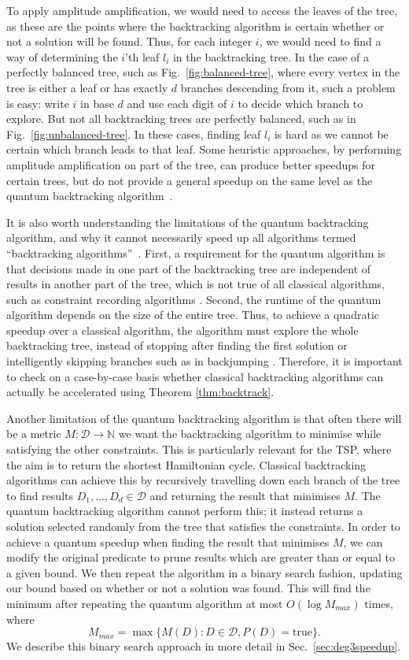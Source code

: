To apply amplitude amplification, we would need to access the leaves of the tree, as these are the points where the backtracking algorithm is certain whether or not a solution will be found. Thus, for each integer $i$, we would need to find a way of determining the $i$'th leaf $l_i$ in the backtracking tree. In the case of a perfectly balanced tree, such as Fig.\ \ref{fig:balanced-tree}, where every vertex in the tree is either a leaf or has exactly $d$ branches descending from it, such a problem is easy: write $i$ in base $d$ and use each digit of $i$ to decide which branch to explore. But not all backtracking trees are perfectly balanced, such as in Fig.\ \ref{fig:unbalanced-tree}. In these cases, finding leaf $l_i$ is hard as we cannot be certain which branch leads to that leaf. Some heuristic approaches, by performing amplitude amplification on part of the tree, can produce better speedups for certain trees, but do not provide a general speedup on the same level as the quantum backtracking algorithm~\cite{montanaro2015}.

It is also worth understanding the limitations of the quantum backtracking algorithm, and why it cannot necessarily speed up all algorithms termed ``backtracking algorithms''~\cite{montanaro2015}. First, a requirement for the quantum algorithm is that decisions made in one part of the backtracking tree are independent of results in another part of the tree, which is not true of all classical algorithms, such as constraint recording algorithms \cite{dechter1990}. Second, the runtime of the quantum algorithm depends on the size of the entire tree. Thus, to achieve a quadratic speedup over a classical algorithm, the algorithm must explore the whole backtracking tree, instead of stopping after finding the first solution or intelligently skipping branches such as in backjumping \cite{dechter1990}. Therefore, it is important to check on a case-by-case basis whether classical backtracking algorithms can actually be accelerated using Theorem \ref{thm:backtrack}.

Another limitation of the quantum backtracking algorithm is that often there will be a metric $M:\mathcal{D} \rightarrow \mathbb{N}$ we want the backtracking algorithm to minimise while satisfying the other constraints. This is particularly relevant for the TSP, where the aim is to return the shortest Hamiltonian cycle. Classical backtracking algorithms can achieve this by recursively travelling down each branch of the tree to find results $D_1,\dots,D_d \in \mathcal{D}$ and returning the result that minimises $M$. The quantum backtracking algorithm cannot perform this; it instead returns a solution selected randomly from the tree that satisfies the constraints. In order to achieve a quantum speedup when finding the result that minimises $M$, we can modify the original predicate to prune results which are greater than or equal to a given bound. We then repeat the algorithm in a binary search fashion, updating our bound based on whether or not a solution was found. This will find the minimum after repeating the quantum algorithm at most $O(\log M_{max})$ times, where 
%
\[M_{max} = \max\{M(D):D\in \mathcal{D}, P(D) = \text{true}\}.\]
%
We describe this binary search approach in more detail in Sec.\ \ref{sec:deg3speedup}.

